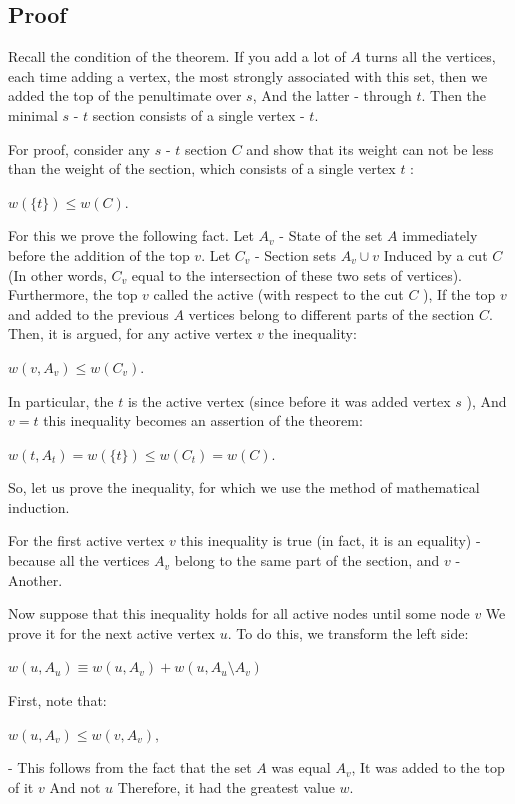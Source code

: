 \subsection{ Proof }

Recall the condition of the theorem. If you add a lot of $A$ turns all the vertices, each time adding a vertex, the most strongly associated with this set, then we added the top of the penultimate over $s$, And the latter - through $t$. Then the minimal $s$ - $t$ section consists of a single vertex - $t$.

For proof, consider any $s$ - $t$ section $C$ and show that its weight can not be less than the weight of the section, which consists of a single vertex $t$ :

$w (\{t \}) ​​\le w (C).$

For this we prove the following fact. Let $A_v$ - State of the set $A$ immediately before the addition of the top $v$. Let $C_v$ - Section sets $A_v \cup v$ Induced by a cut $C$ (In other words, $C_v$ equal to the intersection of these two sets of vertices). Furthermore, the top $v$ called the active (with respect to the cut $C$ ), If the top $v$ and added to the previous $A$ vertices belong to different parts of the section $C$. Then, it is argued, for any active vertex $v$ the inequality:

$w (v, A_v) \le w (C_v).$

In particular, the $t$ is the active vertex (since before it was added vertex $s$ ), And $v = t$ this inequality becomes an assertion of the theorem:

$w (t, A_t) = w (\{t \}) ​​\le w (C_t) = w (C).$

So, let us prove the inequality, for which we use the method of mathematical induction.

For the first active vertex $v$ this inequality is true (in fact, it is an equality) - because all the vertices $A_v$ belong to the same part of the section, and $v$ - Another.

Now suppose that this inequality holds for all active nodes until some node $v$ We prove it for the next active vertex $u$. To do this, we transform the left side:

$w(u,A_{u})\equiv w(u,A_{v})+w(u,A_{u}\setminus A_{v})$

First, note that:

$w (u, A_v) \le w (v, A_v),$

- This follows from the fact that the set $A$ was equal $A_v$, It was added to the top of it $v$ And not $u$ Therefore, it had the greatest value $w$.

